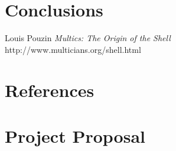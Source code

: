 \documentclass[12pt,twoside,notitlepage]{report}
\begin{document}

\cleardoublepage
\chapter{Conclusions}


\cleardoublepage


\begin{thebibliography}{1} %

  Louis Pouzin
  \emph{Multics: The Origin of the Shell}
  http://www.multicians.org/shell.html

\end{thebibliography}
\cleardoublepage

\appendix

\chapter{References}

\chapter{Project Proposal}
\parindent 0pt
\parskip 6pt

\end{document}
